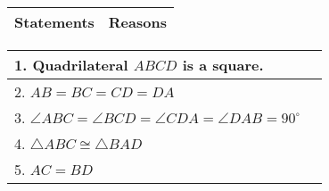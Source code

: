 \begin{center}
\begin{tabularx}{\textwidth}{|Y|Y|}
\hline
\textbf{Statements} & \textbf{Reasons}  \\
\hline
\end{tabularx} 
\begin{tabularx}{\textwidth}{|X|X|}
\hline
1. Quadrilateral \( ABCD \) is a square. & \\
\hline
2. \( AB = BC = CD = DA \) & \\
\hline
3. \( \angle ABC = \angle BCD = \angle CDA = \angle DAB = 90^\circ \) & \\
\hline
4. \( \triangle ABC \cong \triangle BAD \) & \\
\hline
5. \( AC = BD \) & \\
\hline
\end{tabularx}
\end{center}


